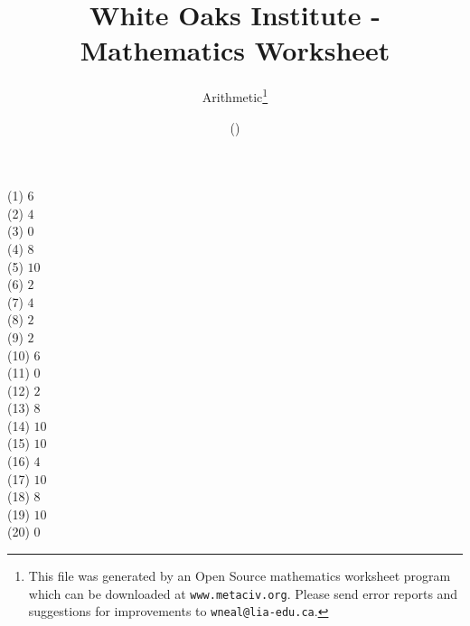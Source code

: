 \documentclass[letter]{article}
\begin{document}
\title{White Oaks Institute - Mathematics Worksheet}
\author{Arithmetic\thanks{This file was generated by an \textsf{Open Source} mathematics worksheet program which can be downloaded at \texttt{www.metaciv.org}. Please send error reports and suggestions for improvements to \texttt{wneal@lia-edu.ca}.}}
\date{\XCfileversion{} (\XCfiledate)}
\maketitle
\begin{multicols}{2}(1) $6$\\(2) $4$\\(3) $0$\\(4) $8$\\(5) $10$\\(6) $2$\\(7) $4$\\(8) $2$\\(9) $2$\\(10) $6$\\(11) $0$\\(12) $2$\\(13) $8$\\(14) $10$\\(15) $10$\\(16) $4$\\(17) $10$\\(18) $8$\\(19) $10$\\(20) $0$\end{multicols}
\end{document}
